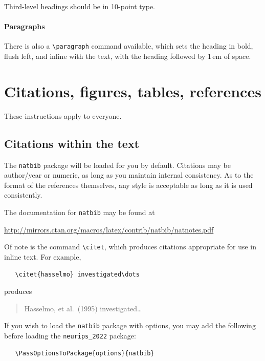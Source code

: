 \documentclass{article}
\begin{document}
Third-level headings should be in 10-point type.


\paragraph{Paragraphs}


There is also a \verb+\paragraph+ command available, which sets the heading in
bold, flush left, and inline with the text, with the heading followed by 1\,em
of space.


\section{Citations, figures, tables, references}
\label{others}


These instructions apply to everyone.


\subsection{Citations within the text}


The \verb+natbib+ package will be loaded for you by default.  Citations may be
author/year or numeric, as long as you maintain internal consistency.  As to the
format of the references themselves, any style is acceptable as long as it is
used consistently.


The documentation for \verb+natbib+ may be found at
\begin{center}
  \url{http://mirrors.ctan.org/macros/latex/contrib/natbib/natnotes.pdf}
\end{center}
Of note is the command \verb+\citet+, which produces citations appropriate for
use in inline text.  For example,
\begin{verbatim}
   \citet{hasselmo} investigated\dots
\end{verbatim}
produces
\begin{quote}
  Hasselmo, et al.\ (1995) investigated\dots
\end{quote}


If you wish to load the \verb+natbib+ package with options, you may add the
following before loading the \verb+neurips_2022+ package:
\begin{verbatim}
   \PassOptionsToPackage{options}{natbib}
\end{verbatim}
\end{document}
